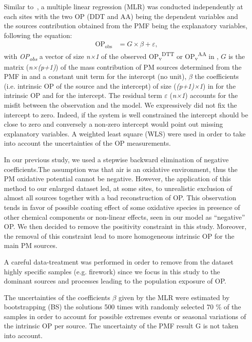 \documentclass[acp]{copernicus}
\begin{document}
Similar to~\citet{weberApportionment2018}, a multiple linear regression (MLR) was
conducted independently at each sites with the two OP (DDT and AA) being
the dependent variables and the sources contribution obtained from the
PMF being the explanatory variables, following the equation:
\begin{align}
    \text{OP}_{\text{obs}} &= G \times \beta + \varepsilon,
\end{align}
with \emph{OP\textsubscript{obs}} a vector of size \emph{n×1} of the
observed OP\textsubscript{v}\textsuperscript{DTT} or
OP\textsubscript{v}\textsuperscript{AA} in , \(G\) is the matrix
(\emph{n×(p+1)}) of the mass contribution of PM sources determined from
the PMF in and a constant unit term for the intercept (no unit),
\emph{$\beta$} the coefficients (i.e. intrinsic OP of the source and the
intercept) of size (\emph{(p+1)×1}) in for the intrinsic OP and for the
intercept. The residual term \emph{$\varepsilon$} (\emph{n×1}) accounts for the
misfit between the observation and the model. We expressively did not
fix the intercept to zero. Indeed, if the system is well constrained the
intercept should be close to zero and conversely a non-zero intercept
would point out missing explanatory variables. A weighted least square
(WLS) were used in order to take into account the uncertainties of the
OP measurements.

In our previous study, we used a stepwise backward
elimination of negative coefficients.The assumption was that air is an
oxidative environment, thus the PM oxidative potential cannot be
negative. However, the application of this method to our enlarged
dataset led, at some sites, to unrealistic exclusion of almost all
sources together with a bad reconstruction of OP. This observation tends
in favor of possible coating effect of some oxidative species in
presence of other chemical components or non-linear effects, seen in our
model as ``negative'' OP. We then decided to remove the positivity
constraint in this study. Moreover, the removal of this constraint lead
to more homogeneous intrinsic OP for the main PM sources.

A careful data-treatment was performed in order to remove from the
dataset highly specific samples (e.g. firework) since we focus in this
study to the dominant sources and processes leading to the population
exposure of OP.

The uncertainties of the coefficients $\beta$ given by the MLR were estimated
by bootstrapping (BS) the solutions 500 times with randomly selected 70
\% of the samples in order to account for possible extremes events or
seasonal variations of the intrinsic OP per source. The uncertainty of
the PMF result G is not taken into account.
\end{document}
